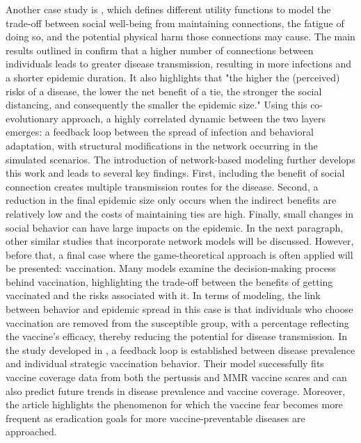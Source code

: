 Another case study is \cite{Nunner2021}, which defines different utility functions to model the trade-off between social well-being from maintaining connections, the fatigue of doing so, and the potential physical harm those connections may cause. The main results outlined in \cite{Nunner2021} confirm that a higher number of connections between individuals leads to greater disease transmission, resulting in more infections and a shorter epidemic duration. It also highlights that "the higher the (perceived) risks of a disease, the lower the net benefit of a tie, the stronger the social distancing, and consequently the smaller the epidemic size."
Using this co-evolutionary approach, a highly correlated dynamic between the two layers emerges: a feedback loop between the spread of infection and behavioral adaptation, with structural modifications in the network occurring in the simulated scenarios.
The introduction of network-based modeling further develops this work and leads to several key findings. First, including the benefit of social connection creates multiple transmission routes for the disease. Second, a reduction in the final epidemic size only occurs when the indirect benefits are relatively low and the costs of maintaining ties are high. Finally, small changes in social behavior can have large impacts on the epidemic.
In the next paragraph, other similar studies that incorporate network models will be discussed. However, before that, a final case where the game-theoretical approach is often applied will be presented: vaccination. Many models examine the decision-making process behind vaccination, highlighting the trade-off between the benefits of getting vaccinated and the risks associated with it.
In terms of modeling, the link between behavior and epidemic spread in this case is that individuals who choose vaccination are removed from the susceptible group, with a percentage reflecting the vaccine's efficacy, thereby reducing the potential for disease transmission. In the study developed in \cite{Bauch_2012_game}, a feedback loop is established between disease prevalence and individual strategic vaccination behavior. Their model successfully fits vaccine coverage data from both the pertussis and MMR vaccine scares and can also predict future trends in disease prevalence and vaccine coverage. 
Moreover, the article highlights the phenomenon for which the vaccine fear becomes more frequent as eradication goals for more vaccine-preventable diseases are approached.

